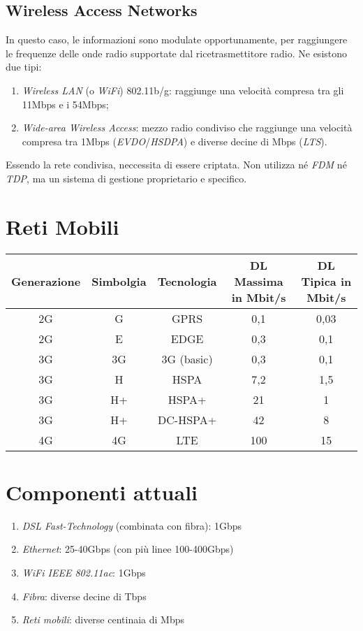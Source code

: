 \subsection{Wireless Access Networks}
In questo caso, le informazioni sono modulate opportunamente, per raggiungere le frequenze delle onde radio supportate dal ricetrasmettitore radio.
Ne esistono due tipi:
\begin{enumerate}
	\item \textit{Wireless LAN} (o \textit{WiFi}) 802.11b/g: raggiunge una velocità compresa tra gli 11Mbps e i 54Mbps;
	\item \textit{Wide-area Wireless Access}: mezzo radio condiviso che raggiunge una velocità compresa tra 1Mbps (\textit{EVDO}/\textit{HSDPA}) e diverse decine di Mbps (\textit{LTS}).
\end{enumerate}
Essendo la rete condivisa, neccessita di essere criptata. Non utilizza né \textit{FDM} né \textit{TDP}, ma un sistema di gestione proprietario e specifico.

\section{Reti Mobili}
\begin{center}
	\begin{tabular}{| c | c | c | c | c |}
		\hline
		\textbf{Generazione} & \textbf{Simbolgia} & \textbf{Tecnologia } & \textbf{DL Massima} in Mbit/s & \textbf{DL Tipica} in Mbit/s \\ \hline
		2G & G & GPRS & 0,1 & 0,03 \\ \hline
		2G & E & EDGE & 0,3 & 0,1 \\ \hline
		3G & 3G & 3G (basic) & 0,3 & 0,1 \\ \hline
		3G & H & HSPA & 7,2 & 1,5 \\ \hline
		3G & H+ & HSPA+ & 21 & 1 \\ \hline
		3G & H+ & DC-HSPA+ & 42 & 8 \\ \hline
		4G & 4G & LTE & 100 & 15 \\ \hline
	\end{tabular}
\end{center}

\section{Componenti attuali}
\begin{enumerate}
	\item \textit{DSL Fast-Technology} (combinata con fibra): 1Gbps
	\item \textit{Ethernet}: 25-40Gbps (con più linee 100-400Gbps)
	\item \textit{WiFi IEEE 802.11ac}: 1Gbps
	\item \textit{Fibra}: diverse decine di Tbps
	\item \textit{Reti mobili}: diverse centinaia di Mbps
\end{enumerate}

